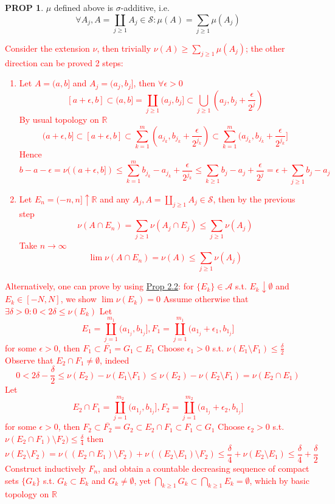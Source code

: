 \documentclass[hidelinks]{article}
\theoremstyle{definition}
\theoremstyle{dotless}
\newtheorem{proposition}{PROP}[section]
\theoremstyle{remark}
\begin{document}
\begin{proposition}
$\mu$ defined above is $\sigma$-additive, i.e.
\[\forall A_j,A=\coprod_{j\geq1}A_j\in\mathscr{S}:\mu(A)=\sum_{j\geq1}\mu(A_j)\]
\end{proposition}
\textcolor{red}{Consider the extension $\nu$, then trivially $\nu(A)\geq\sum_{j\geq1}\mu(A_j)$; the other direction can be proved 2 steps:
\begin{enumerate}[label=\arabic*\degree]
    \item Let $A=(a,b]$ and $A_j=(a_j,b_j]$, then $\forall\epsilon>0$
    \[[a+\epsilon,b]\subset(a,b]=\coprod_{j\geq1}(a_j,b_j]\subset\bigcup_{j\geq1}(a_j,b_j+\frac{\epsilon}{2^j})\]
    By usual topology on $\mathbb{R}$
    \[(a+\epsilon,b]\subset[a+\epsilon,b]\subset\sum_{k=1}^m(a_{j_k},b_{j_k}+\frac{\epsilon}{2^{j_k}})\subset\sum_{k=1}^m(a_{j_k},b_{j_k}+\frac{\epsilon}{2^{j_k}}]\]
    Hence
    \[b-a-\epsilon=\nu((a+\epsilon,b])\leq\sum_{k=1}^mb_{j_k}-a_{j_k}+\frac{\epsilon}{2^{j_k}}\leq\sum_{k\geq1}b_j-a_j+\frac{\epsilon}{2^j}=\epsilon+\sum_{j\geq1}b_j-a_j\]
    \item Let $E_n=(-n,n]\uparrow\mathbb{R}$ and any $A_j,A=\coprod_{j\geq1}A_j\in\mathscr{S}$, then by the previous step
    \[\nu(A\cap E_n)=\sum_{j\geq1}\nu(A_j\cap E_j)\leq\sum_{j\geq1}\nu(A_j)\]
    Take $n\to\infty$
    \[\lim\nu(A\cap E_n)=\nu(A)\leq\sum_{j\geq1}\nu(A_j)\]
\end{enumerate}\bigbreak
Alternatively, one can prove by using \hyperref[Prop 2.2]{Prop 2.2}: for $\{E_k\}\in\mathscr{A}$ s.t. $E_k\downarrow\emptyset$ and $E_k\in[-N,N]$, we show $\lim\nu(E_k)=0$\smallbreak
Assume otherwise that $\exists\delta>0:0<2\delta\leq\nu(E_k)$\newline
Let
\[E_1=\coprod\limits_{j=1}^{m_1}(a_{1_j},b_{1_j}],F_1=\coprod\limits_{j=1}^{m_1}(a_{1_j}+\epsilon_1,b_{1_j}]\]
for some $\epsilon>0$, then $F_1\subset\overline{F_1}=G_1\subset E_1$\newline
Choose $\epsilon_1>0$ s.t. $\nu(E_1\setminus F_1)\leq\frac{\delta}{2}$\medbreak
Observe that $E_2\cap F_1\neq\emptyset$, indeed
\[0<2\delta-\frac{\delta}{2}\leq\nu(E_2)-\nu(E_1\setminus F_1)\leq\nu(E_2)-\nu(E_2\setminus F_1)=\nu(E_2\cap E_1)\]
Let
\[E_2\cap F_1=\coprod\limits_{j=1}^{m_2}(a_{1_j},b_{1_j}],F_2=\coprod\limits_{j=1}^{m_2}(a_{1_j}+\epsilon_2,b_{1_j}]\]
for some $\epsilon>0$, then $F_2\subset\overline{F_2}=G_2\subset E_2\cap F_1\subset F_1\subset G_1$\newline
Choose $\epsilon_2>0$ s.t. $\nu(E_2\cap F_1)\setminus F_2)\leq\frac{\delta}{4}$\newline
then
\[\nu(E_2\setminus F_2)=\nu((E_2\cap E_1)\setminus F_2)+\nu((E_2\setminus E_1)\setminus F_2)\leq\frac{\delta}{4}+\nu(E_2\setminus E_1)\leq\frac{\delta}{4}+\frac{\delta}{2}\]
Construct inductively $F_n$, and obtain a countable decreasing sequence of compact sets $\{G_k\}$ s.t. $G_k\subset E_k$ and $G_k\neq\emptyset$, yet $\bigcap\limits_{k\geq1}G_k\subset\bigcap\limits_{k\geq1}E_k=\emptyset$, which by basic topology on $\mathbb{R}$ \Lightning}
\end{document}
